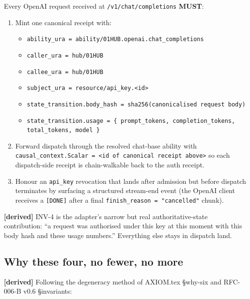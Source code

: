\documentclass[11pt,a4paper]{article}
\newcommand{\derived}{\textcolor{derivedcolor}{\textbf{[derived]}}\xspace}
\theoremstyle{definition}
\begin{document}
\begin{invariant}
Every OpenAI request received at \texttt{/v1/chat/completions}
\textbf{MUST}:
\begin{enumerate}[leftmargin=2em,itemsep=0.1em]
    \item Mint one canonical receipt with:
    \begin{itemize}[leftmargin=1.5em,itemsep=0.05em]
        \item \texttt{ability\_ura = ability/01HUB.openai.chat\_completions}
        \item \texttt{caller\_ura = hub/01HUB}
        \item \texttt{callee\_ura = hub/01HUB}
        \item \texttt{subject\_ura = resource/api\_key.<id>}
        \item \texttt{state\_transition.body\_hash = sha256(canonicalised
        request body)}
        \item \texttt{state\_transition.usage = \{ prompt\_tokens,
        completion\_tokens, total\_tokens, model \}}
    \end{itemize}

    \item Forward dispatch through the resolved chat-base
    ability with \texttt{causal\_context.Scalar = <id of
    canonical receipt above>} so each dispatch-side receipt
    is chain-walkable back to the auth receipt.

    \item Honour an \texttt{api\_key} revocation that lands
    after admission but before dispatch terminates by surfacing
    a structured stream-end event (the OpenAI client receives a
    \texttt{[DONE]} after a final \texttt{finish\_reason =
    "cancelled"} chunk).
\end{enumerate}
\end{invariant}

\derived{} INV-4 is the adapter's narrow but real
authoritative-state contribution: ``a request was authorised
under this key at this moment with this body hash and these
usage numbers.'' Everything else stays in dispatch land.

\subsection{Why these four, no fewer, no more}

\derived{} Following the degeneracy method of AXIOM.tex
§why-six and RFC-006-B v0.6 §invariants:
\end{document}
